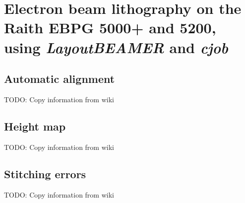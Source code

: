 \chapter{Electron beam lithography on the Raith EBPG 5000+ and 5200, using \textit{LayoutBEAMER} and \textit{cjob}}
\label{app:ebeam}

\section{Automatic alignment}

TODO: Copy information from wiki

\section{Height map}

TODO: Copy information from wiki

\section{Stitching errors}

TODO: Copy information from wiki



